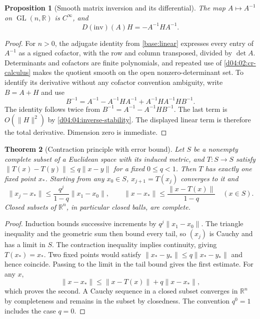 \documentclass[11pt,oneside,openany]{book}
\newtheorem{theorem}{Theorem}[chapter]
\newtheorem{proposition}[theorem]{Proposition}
\theoremstyle{definition}
\theoremstyle{remark}
\newcommand{\R}{\mathbb R}
\newcommand{\norm}[1]{\lVert#1\rVert}
\DeclareMathOperator{\GL}{GL}
\begin{document}
\begin{proposition}[Smooth matrix inversion and its differential]\label{d04:04:matrix-inversion}
The map $A\mapsto A^{-1}$ on $\GL(n,\R)$ is $C^\infty$, and
\[
 D(\mathrm{inv})(A)H=-A^{-1}HA^{-1}.
\]
\end{proposition}
\begin{proof}
For $n>0$, the adjugate identity from \cref{base:linear} expresses every
entry of $A^{-1}$ as a signed cofactor, with the row and column transposed,
divided by $\det A$. Determinants and cofactors are finite polynomials,
and repeated use of \cref{d04:02:cr-calculus} makes the quotient smooth
on the open nonzero-determinant set. To identify its derivative without
any cofactor convention ambiguity, write $B=A+H$ and use
\[
 B^{-1}=A^{-1}-A^{-1}HA^{-1}
                 +A^{-1}HA^{-1}HB^{-1}.
\]
The identity follows twice from $B^{-1}=A^{-1}-A^{-1}HB^{-1}$.
The last term is $O(\norm{H}^2)$ by
\cref{d04:04:inverse-stability}. The displayed linear term is therefore
the total derivative. Dimension zero is immediate.
\end{proof}

\begin{theorem}[Contraction principle with error bound]\label{d04:04:contraction}
Let $S$ be a nonempty complete subset of a Euclidean space with its induced
metric, and $T:S\to S$ satisfy
$\norm{T(x)-T(y)}\leq q\norm{x-y}$ for a fixed $0\leq q<1$.
Then $T$ has exactly one fixed point $x_*$. Starting from any $x_0\in S$,
$x_{j+1}=T(x_j)$ converges to it and
\[
 \norm{x_j-x_*}\leq\frac{q^j}{1-q}\norm{x_1-x_0},\qquad
 \norm{x-x_*}\leq\frac{\norm{x-T(x)}}{1-q}\quad(x\in S).
\]
Closed subsets of $\R^n$, in particular closed balls, are complete.
\end{theorem}
\begin{proof}
Induction bounds successive increments by $q^j\norm{x_1-x_0}$.
The triangle inequality and the geometric sum then bound every tail, so
$(x_j)$ is Cauchy and has a limit in $S$. The contraction inequality implies
continuity, giving $T(x_*)=x_*$. Two fixed points would satisfy
$\norm{x_*-y_*}\leq q\norm{x_*-y_*}$ and hence coincide. Passing to
the limit in the tail bound gives the first estimate. For any $x$,
\[
 \norm{x-x_*}\leq\norm{x-T(x)}+q\norm{x-x_*},
\]
which proves the second. A Cauchy sequence in a closed subset converges
in $\R^n$ by completeness and remains in the subset by closedness.
The convention $q^0=1$ includes the case $q=0$.
\end{proof}
\end{document}
